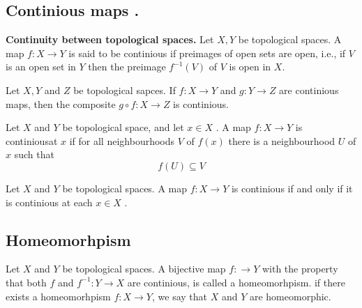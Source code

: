 \documentclass{article}
\theoremstyle{remark}
\begin{document}
\subsection{Continious maps .}%
\label{sub:continious_maps}

\begin{theorem}
    \textbf{Continuity between topological spaces.}
Let $X,Y$ be topological spaces. A map $f: X \to Y$ is said to be continious if preimages of open sets are open, i.e.,
if $V$ is an open set in $Y$ then the preimage $f^{-1} \left( V \right)$ of $V$ is open in $X$.
\end{theorem}

\begin{theorem}
    Let $X,Y $ and $ Z $ be topological sapces. If $f: X\to Y$  and $g: Y\to Z$  are continious maps, then the composite
    $g \circ f: X \to Z $ is continious.
\end{theorem}

\begin{definition}
    Let $X$ and $Y$ be topological space, and let $x \in X$ . A map $f: X \to Y$  is continiousat $x$  if for all
    neighbourhoods $V$  of $f\left( x \right)$  there is a neighbourhood $U$ of $x$  such that \[
    f\left( U \right) \subseteq V
    \]

\end{definition}

\begin{theorem}
    Let $X$ and $Y$  be topological spaces. A map $f: X \to Y$ is continious if and only if it is continious at each $x
    \in X$ .
\end{theorem}

\subsection{Homeomorhpism}%
\label{sub:homeomorhpism}

\begin{definition}[Homeomorphism]
Let $X$  and $Y$  be topological spaces. A bijective map $f: \to Y$  with the property that both $f$ and $f^{-1}: Y \to
X $   are continious, is called a homeomorhpism. if there exists a homeomorhpism $f: X \to Y$, we say that $X$
and $Y$ are homeomorphic.
\end{definition}
\end{document}
